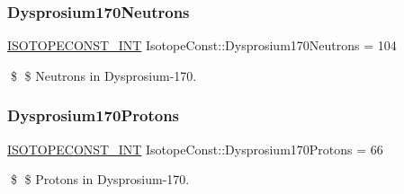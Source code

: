 \subsubsection{\texorpdfstring{Dysprosium170\+Neutrons}{Dysprosium170Neutrons}}
{\footnotesize\ttfamily \mbox{\hyperlink{group___isotope_const-_macros_ga5f18360b3e99483a35c32d789e62621c}{I\+S\+O\+T\+O\+P\+E\+C\+O\+N\+S\+T\+\_\+\+I\+NT}} Isotope\+Const\+::\+Dysprosium170\+Neutrons = 104}

\$ \$ Neutrons in Dysprosium-\/170. \mbox{\label{group___isotope_const-_dysprosium-_dy170_ga271c3ad471554c78dad1ad96811b4b42}} 
\subsubsection{\texorpdfstring{Dysprosium170\+Protons}{Dysprosium170Protons}}
{\footnotesize\ttfamily \mbox{\hyperlink{group___isotope_const-_macros_ga5f18360b3e99483a35c32d789e62621c}{I\+S\+O\+T\+O\+P\+E\+C\+O\+N\+S\+T\+\_\+\+I\+NT}} Isotope\+Const\+::\+Dysprosium170\+Protons = 66}

\$ \$ Protons in Dysprosium-\/170. 